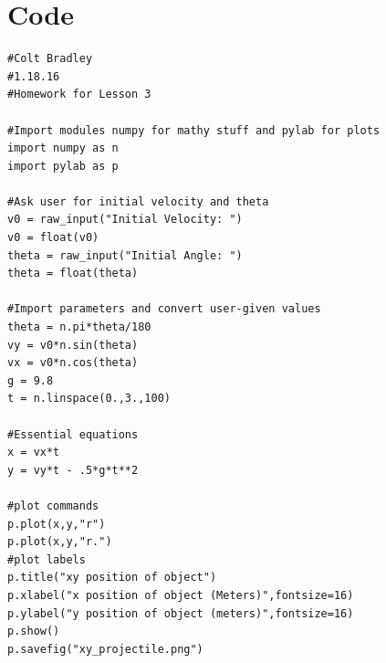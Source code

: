\documentclass[11pt]{article}
\begin{document}
\section{Code}
\begin{verbatim}
#Colt Bradley
#1.18.16
#Homework for Lesson 3

#Import modules numpy for mathy stuff and pylab for plots
import numpy as n
import pylab as p

#Ask user for initial velocity and theta
v0 = raw_input("Initial Velocity: ")
v0 = float(v0)
theta = raw_input("Initial Angle: ")
theta = float(theta)

#Import parameters and convert user-given values
theta = n.pi*theta/180
vy = v0*n.sin(theta)
vx = v0*n.cos(theta)
g = 9.8
t = n.linspace(0.,3.,100)

#Essential equations
x = vx*t
y = vy*t - .5*g*t**2

#plot commands
p.plot(x,y,"r")
p.plot(x,y,"r.")
#plot labels
p.title("xy position of object")
p.xlabel("x position of object (Meters)",fontsize=16)
p.ylabel("y position of object (meters)",fontsize=16)
p.show()
p.savefig("xy_projectile.png")
\end{verbatim}
\end{document}
